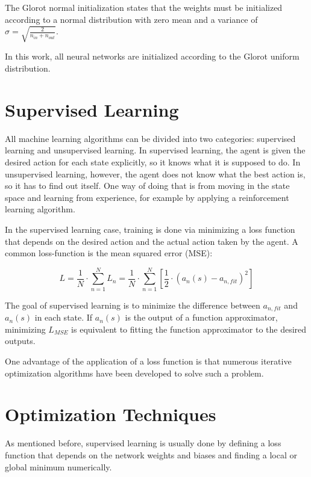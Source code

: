The Glorot normal initialization states that the weights must be initialized according to a normal distribution with zero mean and a variance of $\sigma = \sqrt{\frac{2}{n_{in}+n_{out}}}$.

In this work, all neural networks are initialized according to the Glorot uniform distribution. 

\section{Supervised Learning}
All machine learning algorithms can be divided into two categories: supervised learning and unsupervised learning. In supervised learning, the agent is given the desired action for each state explicitly, so it knows what it is supposed to do. In unsupervised learning, however, the agent does not know what the best action is, so it has to find out itself. One way of doing that is from moving in the state space and learning from experience, for example by applying a reinforcement learning algorithm.

In the supervised learning case, training is done via minimizing a loss function that depends on the desired action and the actual action taken by the agent. A common loss-function is the mean squared error (MSE):

\begin{equation}
L = \frac{1}{N}\cdot\sum_{n=1}^{N}L_n =  \frac{1}{N}\cdot\sum_{n=1}^{N}[\frac{1}{2}\cdot(a_n(s)-a_{n,fit})^2]
\label{lossfun}
\end{equation}

The goal of supervised learning is to minimize the difference between $a_{n,fit}$ and $a_n(s)$ in each state. If $a_n(s)$ is the output of a function approximator, minimizing $L_{MSE}$ is equivalent to fitting the function approximator to the desired outputs.

One advantage of the application of a loss function is that numerous iterative optimization algorithms have been developed to solve such a problem.

\section{Optimization Techniques}

As mentioned before, supervised learning is usually done by defining a loss function that depends on the network weights and biases and finding a local or global minimum numerically.

